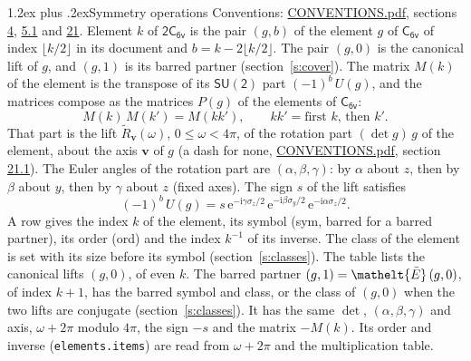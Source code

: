 \documentclass[10pt,a4paper]{article}
\makeatletter
\renewcommand\section{\@startsection{section}{1}{\z@}{-3ex plus -1ex minus -.2ex}%
  {1.2ex plus .2ex}{\normalfont\large\sffamily\bfseries\color{parttitle}}}
\numberwithin{equation}{section}
\newcommand{\eltfont}[1]{{\let\sigma\eltsigma\mathelt{#1}}}
\newcommand{\grp}[1]{\mathsf{#1}}
\newcommand{\elt}[1]{\eltfont{#1}}
\newcommand{\vv}{\mathbf{v}}
\newcommand{\iunit}{\mathrm{i}}
\newcommand{\expe}{\mathrm{e}}
\newcommand{\barred}[1]{\bar{#1}}
\newcommand{\lift}[1]{\tilde{#1}}
\newcommand{\pauli}[1]{\sigma_{#1}}
\makeatother
\begin{document}
\section{Symmetry operations}\label{s:elements}
Conventions: \href{../../CONVENTIONS.pdf}{CONVENTIONS.pdf}, sections \href{../../../rotation/CONVENTIONS.pdf\#conv.4}{4}, \href{../../../rotation/CONVENTIONS.pdf\#conv.5.1}{5.1} and \href{../../CONVENTIONS.pdf\#conv.21}{21}.
\leavevmode\label{n:index.element}\label{n:element.g}Element $k$ of $\grp{2C_{6v}}$ is the pair $(g, b)$ of the element $g$ of \href{../../../rotation/data/pdf/C6v.pdf}{$\grp{C_{6v}}$} of index $\lfloor k/2\rfloor$ in its document and $b = k - 2\lfloor k/2\rfloor$. The pair $(g, 0)$ is the canonical lift of $g$, and $(g, 1)$ is its barred partner (section~\ref{s:cover}). \label{n:matrix.element.pin}\label{n:matrix.element}The matrix $M(k)$ of the element is the transpose of its $\grp{SU(2)}$ part $(-1)^{b}\,U(g)$, and the matrices compose as the matrices $P(g)$ of the elements of $\grp{C_{6v}}$:
\begin{equation}\label{e:mprod}M(k)\,M(k') = M(kk'),\qquad kk' = \text{first } k\text{, then } k'.\end{equation}
\leavevmode\label{n:angle.omega}\label{n:vector.axis}\label{n:vector.pole}That part is the lift $\lift{R}_{\vv}(\omega)$, $0 \le \omega < 4\pi$, of the rotation part $(\det g)\,g$ of the element, about the axis $\vv$ of $g$ (a dash for none, \href{../../CONVENTIONS.pdf}{CONVENTIONS.pdf}, section \href{../../CONVENTIONS.pdf\#conv.21.1}{21.1}). \label{n:angle.euler.alpha}\label{n:angle.euler.beta}\label{n:angle.euler.gamma}\label{n:vector.coordinates}The Euler angles of the rotation part are $(\alpha,\beta,\gamma)$: by $\alpha$ about $z$, then by $\beta$ about $y$, then by $\gamma$ about $z$ (fixed axes). \label{n:local.euler.sign}The sign $s$ of the lift satisfies
\begin{equation}\label{e:euler}(-1)^{b}\,U(g) = s\,\expe^{-\iunit\gamma\pauli{z}/2}\,\expe^{-\iunit\beta\pauli{y}/2}\,\expe^{-\iunit\alpha\pauli{z}/2}.\end{equation}
\leavevmode\label{n:index.element.inverse}\label{n:head.sym}\label{n:head.ord}A row gives the index $k$ of the element, its symbol (sym, barred for a barred partner), its order (ord) and the index $k^{-1}$ of its inverse. \label{n:head.class}The class of the element is set with its size before its symbol (section~\ref{s:classes}).
The table lists the canonical lifts $(g, 0)$, of even $k$. The barred partner $(g, 1) = \elt{\barred{E}}\,(g, 0)$, of index $k + 1$, has the barred symbol and class, or the class of $(g, 0)$ when the two lifts are conjugate (section~\ref{s:classes}). It has the same $\det$, $(\alpha,\beta,\gamma)$ and axis, $\omega + 2\pi$ modulo $4\pi$, the sign $-s$ and the matrix $-M(k)$. Its order and inverse (\texttt{elements.items}) are read from $\omega + 2\pi$ and the multiplication table.
\end{document}
